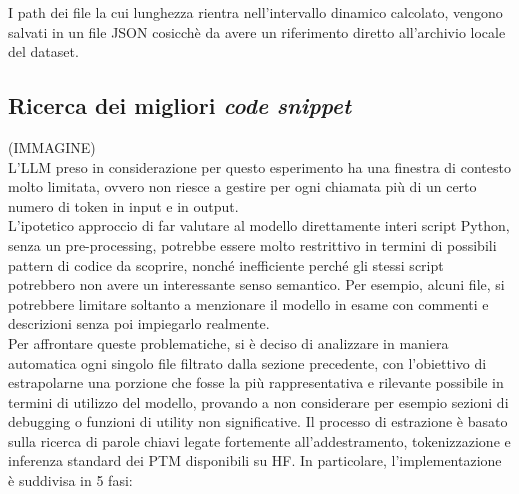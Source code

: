 \documentclass{article}
\begin{document}
I path dei file la cui lunghezza rientra nell'intervallo dinamico calcolato, vengono salvati in un file JSON cosicchè da avere un riferimento diretto all'archivio locale del dataset.

\subsection{Ricerca dei migliori \textit{code snippet}}
(IMMAGINE)\\
L'LLM preso in considerazione per questo esperimento ha una finestra di contesto molto limitata, ovvero non riesce a gestire per ogni chiamata più di un certo numero di token in input e in output.\\
L'ipotetico approccio di far valutare al modello direttamente interi script Python, senza un pre-processing, potrebbe essere molto restrittivo in termini di possibili pattern di codice da scoprire, nonché inefficiente perché gli stessi script potrebbero non avere un interessante senso semantico. Per esempio, alcuni file, si potrebbere limitare soltanto a menzionare il modello in esame con commenti e descrizioni senza poi impiegarlo realmente.\\
Per affrontare queste problematiche, si è deciso di analizzare in maniera automatica ogni singolo file filtrato dalla sezione precedente, con l'obiettivo di estrapolarne una porzione che fosse la più rappresentativa e rilevante possibile in termini di utilizzo del modello, provando a non considerare per esempio sezioni di debugging o funzioni di utility non significative. Il processo di estrazione è basato sulla ricerca di parole chiavi legate fortemente all'addestramento, tokenizzazione e inferenza standard dei PTM disponibili su HF. In particolare, l'implementazione è suddivisa in 5 fasi:\\
\end{document}
